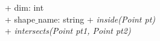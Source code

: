 {
+ dim: int \\
+ shape$\_$name: string
}
{
+  \textit{inside(Point pt)} \\
+  \textit{intersects(Point pt1, Point pt2)}
}